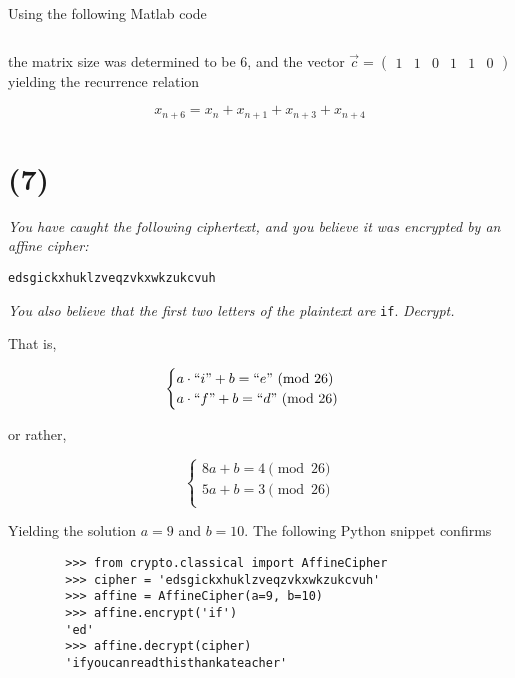 \documentclass[12pt]{article}
\begin{document}
    Using the following Matlab code

    \inputminted[breaklines=true]{matlab}{../snippets/matlab/LFSR.m}

    the matrix size was determined to be $6$, and the vector $\vec{c} = \begin{pmatrix}1 & 1 & 0 & 1 & 1 & 0\end{pmatrix}$ yielding the recurrence relation

    $$ x_{n + 6} = x_n + x_{n + 1} + x_{n + 3} + x_{n + 4}$$

\section*{(7)} \textit{You have caught the following ciphertext, and you believe it was encrypted by an affine cipher:}

    \begin{center}
      \texttt{edsgickxhuklzveqzvkxwkzukcvuh}
    \end{center}

    \textit{You also believe that the first two letters of the plaintext are} \texttt{if}. \textit{Decrypt.}

    That is,

    $$\begin{cases}
    a \cdot ``i" + b = ``e" \pmod{26}\\
    a \cdot ``f" + b = ``d" \pmod{26}\\
    \end{cases}$$

    or rather,

    $$\begin{cases}
    8a + b = 4 \pmod{26}\\
    5a + b = 3 \pmod{26}\\
    \end{cases}$$

    Yielding the solution $a = 9$ and $b = 10$. The following Python snippet confirms

    \begin{verbatim}
        >>> from crypto.classical import AffineCipher
        >>> cipher = 'edsgickxhuklzveqzvkxwkzukcvuh'
        >>> affine = AffineCipher(a=9, b=10)
        >>> affine.encrypt('if')
        'ed'
        >>> affine.decrypt(cipher)
        'ifyoucanreadthisthankateacher'
    \end{verbatim}
\end{document}
